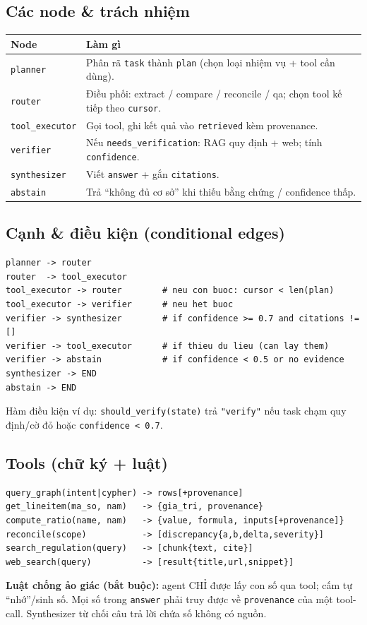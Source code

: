 \documentclass[11pt,a4paper]{article}
\begin{document}
\subsection{Các node \& trách nhiệm}
\begin{longtable}{>{\raggedright\arraybackslash}p{3.0cm} >{\raggedright\arraybackslash}p{12cm}}
\toprule
\textbf{Node} & \textbf{Làm gì} \\
\midrule
\endhead
\texttt{planner} & Phân rã \texttt{task} thành \texttt{plan} (chọn loại nhiệm vụ + tool cần dùng). \\
\texttt{router} & Điều phối: extract / compare / reconcile / qa; chọn tool kế tiếp theo \texttt{cursor}. \\
\texttt{tool\_executor} & Gọi tool, ghi kết quả vào \texttt{retrieved} kèm provenance. \\
\texttt{verifier} & Nếu \texttt{needs\_verification}: RAG quy định + web; tính \texttt{confidence}. \\
\texttt{synthesizer} & Viết \texttt{answer} + gắn \texttt{citations}. \\
\texttt{abstain} & Trả ``không đủ cơ sở'' khi thiếu bằng chứng / confidence thấp. \\
\bottomrule
\end{longtable}

\subsection{Cạnh \& điều kiện (conditional edges)}
\begin{Verbatim}
planner -> router
router  -> tool_executor
tool_executor -> router        # neu con buoc: cursor < len(plan)
tool_executor -> verifier      # neu het buoc
verifier -> synthesizer        # if confidence >= 0.7 and citations != []
verifier -> tool_executor      # if thieu du lieu (can lay them)
verifier -> abstain            # if confidence < 0.5 or no evidence
synthesizer -> END
abstain -> END
\end{Verbatim}
Hàm điều kiện ví dụ: \texttt{should\_verify(state)} trả \texttt{"verify"} nếu task chạm quy định/cờ đỏ hoặc \texttt{confidence < 0.7}.

\subsection{Tools (chữ ký + luật)}
\begin{Verbatim}
query_graph(intent|cypher) -> rows[+provenance]
get_lineitem(ma_so, nam)   -> {gia_tri, provenance}
compute_ratio(name, nam)   -> {value, formula, inputs[+provenance]}
reconcile(scope)           -> [discrepancy{a,b,delta,severity}]
search_regulation(query)   -> [chunk{text, cite}]
web_search(query)          -> [result{title,url,snippet}]
\end{Verbatim}
\begin{ghichu}
\textbf{Luật chống ảo giác (bắt buộc):} agent CHỈ được lấy con số qua tool; cấm tự ``nhớ''/sinh số. Mọi số trong \texttt{answer} phải truy được về \texttt{provenance} của một tool-call. Synthesizer từ chối câu trả lời chứa số không có nguồn.
\end{ghichu}
\end{document}
